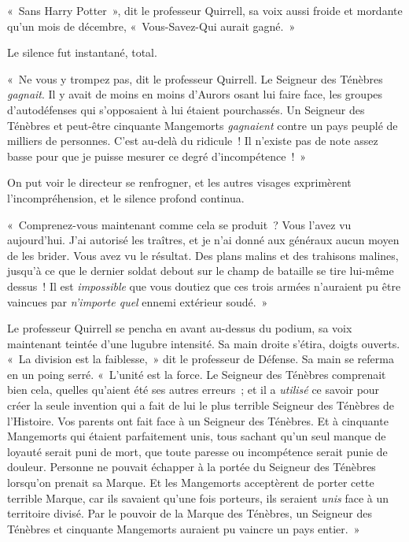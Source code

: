 «~Sans Harry Potter~», dit le professeur Quirrell, sa voix aussi froide et mordante qu'un mois de décembre, «~Vous-Savez-Qui aurait gagné.~»

Le silence fut instantané, total.

\later

«~Ne vous y trompez pas, dit le professeur Quirrell. Le Seigneur des Ténèbres \emph{gagnait}. Il y avait de moins en moins d'Aurors osant lui faire face, les groupes d'autodéfenses qui s'opposaient à lui étaient pourchassés. Un Seigneur des Ténèbres et peut-être cinquante Mangemorts \emph{gagnaient} contre un pays peuplé de milliers de personnes. C'est au-delà du ridicule~! Il n'existe pas de note assez basse pour que je puisse mesurer ce degré d'incompétence~!~»

On put voir le directeur se renfrogner, et les autres visages exprimèrent l'incompréhension, et le silence profond continua.

«~Comprenez-vous maintenant comme cela se produit~? Vous l'avez vu aujourd'hui. J'ai autorisé les traîtres, et je n'ai donné aux généraux aucun moyen de les brider. Vous avez vu le résultat. Des plans malins et des trahisons malines, jusqu'à ce que le dernier soldat debout sur le champ de bataille se tire lui-même dessus~! Il est \emph{impossible} que vous doutiez que ces trois armées n'auraient pu être vaincues par \emph{n'importe quel} ennemi extérieur soudé.~»

Le professeur Quirrell se pencha en avant au-dessus du podium, sa voix maintenant teintée d'une lugubre intensité. Sa main droite s'étira, doigts ouverts. «~La division est la faiblesse,~» dit le professeur de Défense. Sa main se referma en un poing serré. «~L'unité est la force. Le Seigneur des Ténèbres comprenait bien cela, quelles qu'aient été ses autres erreurs~; et il a \emph{utilisé} ce savoir pour créer la seule invention qui a fait de lui le plus terrible Seigneur des Ténèbres de l'Histoire. Vos parents ont fait face à un Seigneur des Ténèbres. Et à cinquante Mangemorts qui étaient parfaitement unis, tous sachant qu'un seul manque de loyauté serait puni de mort, que toute paresse ou incompétence serait punie de douleur. Personne ne pouvait échapper à la portée du Seigneur des Ténèbres lorsqu'on prenait sa Marque. Et les Mangemorts acceptèrent de porter cette terrible Marque, car ils savaient qu'une fois porteurs, ils seraient \emph{unis} face à un territoire divisé. Par le pouvoir de la Marque des Ténèbres, un Seigneur des Ténèbres et cinquante Mangemorts auraient pu vaincre un pays entier.~»

